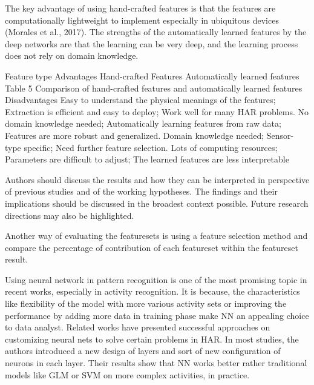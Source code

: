 \documentclass[journal,article,submit,moreauthors,pdftex]{Definitions/mdpi}
\begin{document}
The key advantage of using hand-crafted features is that the features are computationally lightweight to implement especially in ubiquitous devices (Morales et al., 2017).
The strengths of the automatically learned features by the deep networks are that the learning can be very deep, and the learning process does not rely on domain knowledge.


Feature type Advantages
Hand-crafted Features
Automatically learned features
Table 5 Comparison of hand-crafted features and automatically learned features Disadvantages
Easy to understand the physical meanings of the features; Extraction is efficient and easy to deploy; Work well for many HAR problems.
No domain knowledge needed; Automatically learning features from raw data; Features are more robust and generalized.
Domain knowledge needed; Sensor-type specific; Need further feature selection.
Lots of computing resources; Parameters are difficult to adjust; The learned features are less interpretable


Authors should discuss the results and how they can be interpreted in perspective of previous studies and of the working hypotheses. The findings and their implications should be discussed in the broadest context possible. Future research directions may also be highlighted.

Another way of evaluating the featuresets is using a feature selection method and compare the percentage of contribution of each featureset within the featureset result.


Using neural network in pattern recognition is one of the most promising topic in recent works, especially in activity recognition. It is because, the characteristics like flexibility of the model with more various activity sets or improving the performance by adding more data in training phase make NN an appealing choice to data analyst. Related works have presented successful approaches on customizing neural nets to solve certain problems in HAR. In most studies, the authors introduced a new design of layers and sort of new configuration of neurons in each layer. Their results show that NN works better rather traditional models like GLM or SVM on more complex activities, in practice.
\end{document}
